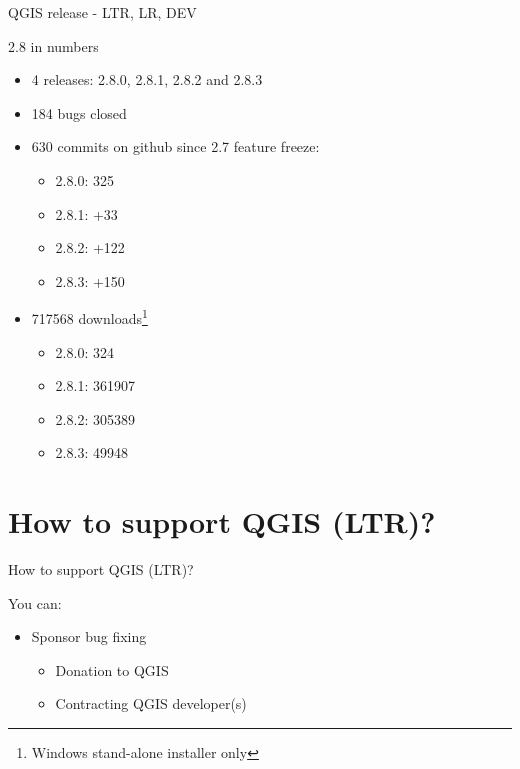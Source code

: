 \begin{frame}{QGIS release - LTR, LR, DEV}
	\begin{block}{2.8 in numbers}
		\begin{itemize}
			\item 4 releases: 2.8.0, 2.8.1, 2.8.2 and 2.8.3
			\item 184 bugs closed
			\item 630 commits on github since 2.7 feature freeze:
				\begin{itemize}
					\item 2.8.0: 325
					\item 2.8.1: +33
					\item 2.8.2: +122
					\item 2.8.3: +150
				\end{itemize}
			\item 717568 downloads\footnote{Windows stand-alone installer only}
				\begin{itemize}
					\item 2.8.0: 324
					\item 2.8.1: 361907
					\item 2.8.2: 305389
					\item 2.8.3: 49948
				\end{itemize}			
		\end{itemize}
	\end{block}
\end{frame}



\section{How to support QGIS (LTR)?}

\begin{frame}{How to support QGIS (LTR)?}
	\begin{block}{You can:}
		\begin{itemize}
			\item Sponsor bug fixing
				\begin{itemize}
					\item Donation to QGIS
					\item Contracting QGIS developer(s)
				\end{itemize}
		\end{itemize}
	\end{block}
\end{frame}

